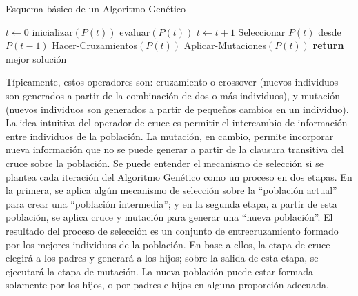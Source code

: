 \documentclass[9pt,a4paper,twoside]{rho-class/rho}
\begin{document}
            \begin{algorithm}
                \caption{Esquema básico de un Algoritmo Genético}
                \begin{algorithmic}[1]
                \State $t \gets 0$
                \State inicializar$(P(t))$
                \State evaluar$(P(t))$
                    \State $t \gets t + 1$
                    \State Seleccionar $P(t)$ desde $P(t-1)$
                    \State Hacer-Cruzamientos$(P(t))$
                    \State Aplicar-Mutaciones$(P(t))$
                \EndWhile
                \State \textbf{return} mejor solución
                \EndProcedure
                \end{algorithmic}
                \label{alg:AG}
            \end{algorithm}


            Típicamente, estos operadores son: cruzamiento o crossover (nuevos individuos son generados a partir de la combinación de dos o más individuos), y mutación (nuevos individuos son generados a partir de pequeños cambios en un individuo).
            La idea intuitiva del operador de cruce es permitir el intercambio de información entre individuos de la población. La mutación, en cambio, permite incorporar nueva información que no se puede generar a partir de la clausura transitiva del cruce sobre la población.
            Se puede entender el mecanismo de selección si se plantea cada iteración del Algoritmo
            Genético como un proceso en dos etapas. En la primera, se aplica algún mecanismo de selección sobre la “población actual” para crear una “población intermedia”; y en la segunda etapa, a partir de esta población, se aplica cruce y mutación para generar una “nueva población”.
            El resultado del proceso de selección es un conjunto de entrecruzamiento formado por los mejores individuos de la población. En base a ellos, la etapa de cruce elegirá a los padres y generará a los hijos; sobre la salida de esta etapa, se ejecutará la etapa de mutación. La nueva población puede estar formada solamente por los hijos, o por padres e hijos en alguna proporción adecuada.
\end{document}
